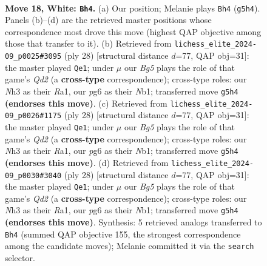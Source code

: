 \documentclass[11pt]{article}
\begin{document}
\clearpage

\begin{figure}[p]\centering
\begin{subfigure}{0.46\textwidth}\centering
\resizebox{\linewidth}{!}{%
\newchessgame
\chessboard[
  setfen={r3r1k1/1bqn1pbp/6p1/pppPp1B1/4P3/1BP3PN/P4P1P/R1Q1K2R w - - 0 18},
  showmover=false,
  pgfstyle=straightmove, color=movearrow, markmove={g5-h4}
]}
\caption{}
\end{subfigure}\hfill
\begin{subfigure}{0.46\textwidth}\centering
\resizebox{\linewidth}{!}{%
\newchessgame
\chessboard[
  setfen={r4rk1/p3qpbp/2p1bnp1/4p3/Pp2P3/3BB2P/1PPQ1PP1/RN1R2K1 w - - 4 15},
  showmover=false,
  pgfstyle=straightmove, color=movearrow, markmove={d2-e1}
]}
\caption{}
\end{subfigure}
\\[4pt]
\begin{subfigure}{0.46\textwidth}\centering
\resizebox{\linewidth}{!}{%
\newchessgame
\chessboard[
  setfen={r4rk1/p3qpbp/2p1bnp1/4p3/Pp2P3/3BB2P/1PPQ1PP1/RN1R2K1 w - - 4 15},
  showmover=false,
  pgfstyle=straightmove, color=movearrow, markmove={d2-e1}
]}
\caption{}
\end{subfigure}\hfill
\begin{subfigure}{0.46\textwidth}\centering
\resizebox{\linewidth}{!}{%
\newchessgame
\chessboard[
  setfen={r4rk1/p3qpbp/2p1bnp1/4p3/Pp2P3/3BB2P/1PPQ1PP1/RN1R2K1 w - - 4 15},
  showmover=false,
  pgfstyle=straightmove, color=movearrow, markmove={d2-e1}
]}
\caption{}
\end{subfigure}
\caption{\textbf{Move 18, White: \texttt{Bh4}.} (a) Our position; Melanie plays \texttt{Bh4} (\texttt{g5h4}). Panels (b)--(d) are the retrieved master positions whose correspondence most drove this move (highest QAP objective among those that transfer to it). (b) Retrieved from \texttt{lichess\_elite\_2024-09\_p0025\#3095} (ply 28) [structural distance $d$=77, QAP obj=31]: the master played \texttt{Qe1}; under $\mu$ our \emph{Bg5} plays the role of that game's \emph{Qd2} (a \textbf{cross-type} correspondence); cross-type roles: our \emph{N}h3 as their \emph{R}a1, our \emph{p}g6 as their \emph{N}b1; transferred move \texttt{g5h4} \textbf{(endorses this move)}. (c) Retrieved from \texttt{lichess\_elite\_2024-09\_p0026\#1175} (ply 28) [structural distance $d$=77, QAP obj=31]: the master played \texttt{Qe1}; under $\mu$ our \emph{Bg5} plays the role of that game's \emph{Qd2} (a \textbf{cross-type} correspondence); cross-type roles: our \emph{N}h3 as their \emph{R}a1, our \emph{p}g6 as their \emph{N}b1; transferred move \texttt{g5h4} \textbf{(endorses this move)}. (d) Retrieved from \texttt{lichess\_elite\_2024-09\_p0030\#3040} (ply 28) [structural distance $d$=77, QAP obj=31]: the master played \texttt{Qe1}; under $\mu$ our \emph{Bg5} plays the role of that game's \emph{Qd2} (a \textbf{cross-type} correspondence); cross-type roles: our \emph{N}h3 as their \emph{R}a1, our \emph{p}g6 as their \emph{N}b1; transferred move \texttt{g5h4} \textbf{(endorses this move)}. Synthesis: 5 retrieved analogs transferred to \texttt{Bh4} (summed QAP objective 155, the strongest correspondence among the candidate moves); Melanie committed it via the \texttt{search} selector.}

\end{figure}
\end{document}
